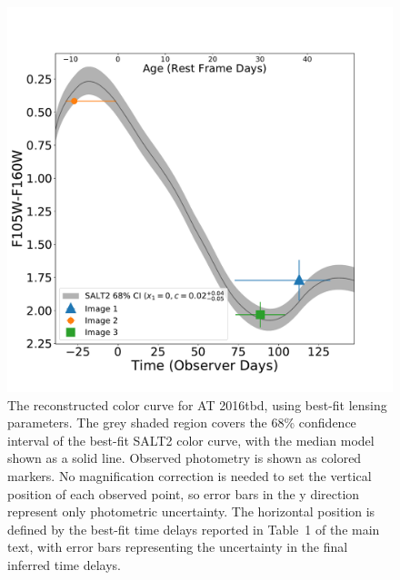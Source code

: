 \documentclass[12pt]{article}
\def\SNABC{AT 2016tbd\xspace}
\begin{document}
\begin{figure}[hbp]
    \centering
    \includegraphics[width=\textwidth]{Paper/Figures/full_colorcurve_total.pdf}
    \caption{\label{fig:full_colorcurve} The reconstructed color curve for \SNABC, using best-fit lensing parameters. The grey shaded region covers the 68\% confidence interval of the best-fit SALT2 color curve, with the median model shown as a solid line. Observed photometry is shown as colored markers.  No magnification correction is needed to set the vertical position of each observed point, so error bars in the y direction represent only photometric uncertainty. The horizontal position is defined by the best-fit time delays reported in Table~1 of the main text, with error bars 
    representing the uncertainty in the final inferred time delays. }
\end{figure}

\clearpage



%

\end{document}
